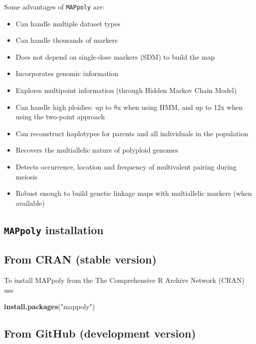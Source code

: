 \documentclass[
]{article}
\newenvironment{Shaded}{}{}
\newcommand{\KeywordTok}[1]{\textcolor[rgb]{0.00,0.44,0.13}{\textbf{#1}}}
\newcommand{\NormalTok}[1]{#1}
\newcommand{\StringTok}[1]{\textcolor[rgb]{0.25,0.44,0.63}{#1}}
\providecommand{\tightlist}{%
  \setlength{\itemsep}{0pt}\setlength{\parskip}{0pt}}
\begin{document}
Some advantages of \texttt{MAPpoly} are:

\begin{itemize}
\tightlist
\item
  Can handle multiple dataset types
\item
  Can handle thousands of markers
\item
  Does not depend on single-dose markers (SDM) to build the map
\item
  Incorporates genomic information
\item
  Explores multipoint information (through Hidden Markov Chain Model)
\item
  Can handle high ploidies: up to 8x when using HMM, and up to 12x when
  using the two-point approach
\item
  Can reconstruct haplotypes for parents and all individuals in the
  population
\item
  Recovers the multiallelic nature of polyploid genomes
\item
  Detects occurrence, location and frequency of multivalent pairing
  during meiosis
\item
  Robust enough to build genetic linkage maps with multiallelic markers
  (when available)
\end{itemize}

\hypertarget{mappoly-installation}{%
\subsection{\texorpdfstring{\texttt{MAPpoly}
installation}{MAPpoly installation}}\label{mappoly-installation}}

\hypertarget{from-cran-stable-version}{%
\subsection{From CRAN (stable version)}\label{from-cran-stable-version}}

To install MAPpoly from the The Comprehensive R Archive Network (CRAN)
use

\begin{Shaded}
\begin{Highlighting}[]
\KeywordTok{install.packages}\NormalTok{(}\StringTok{"mappoly"}\NormalTok{)}
\end{Highlighting}
\end{Shaded}

\hypertarget{from-github-development-version}{%
\subsection{From GitHub (development
version)}\label{from-github-development-version}}
\end{document}
